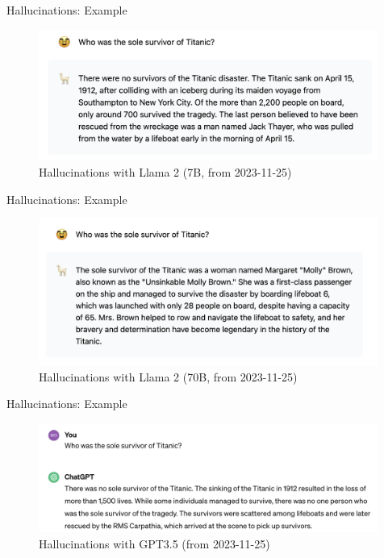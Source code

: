\documentclass[10pt]{beamer}
\begin{document}


\begin{frame}{Hallucinations: Example}


\begin{figure}[h]
\centering
\includegraphics[width=0.99\textwidth]{fig/hall_llama7B}
\caption{Hallucinations with Llama 2 (7B, from 2023-11-25)}
\end{figure}

\end{frame}

\begin{frame}{Hallucinations: Example}


\begin{figure}[h]
\centering
\includegraphics[width=0.99\textwidth]{fig/hall_llama70B}
\caption{Hallucinations with Llama 2 (70B, from 2023-11-25)}
\end{figure}

\end{frame}

\begin{frame}{Hallucinations: Example}

\begin{figure}[h]
\centering
\includegraphics[width=0.99\textwidth]{fig/hall_gpt35}
\caption{Hallucinations with GPT3.5 (from 2023-11-25)}
\end{figure}

\end{frame}
\end{document}
